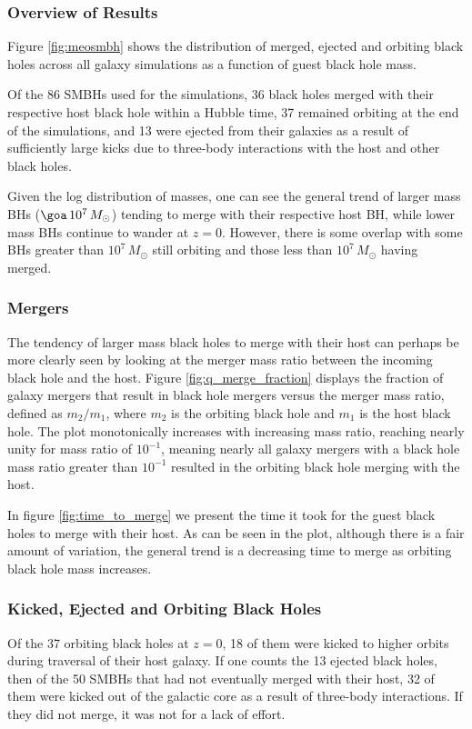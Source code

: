 \documentclass[fleqn,usenatbib,useAMS]{mnras}
\begin{document}
\subsubsection{Overview of Results}\label{sec:results_overview}
Figure \ref{fig:meosmbh} shows the distribution of merged, ejected and orbiting black holes across all galaxy simulations as a function of guest black hole mass.

Of the 86 SMBHs used for the simulations, 36 black holes merged with their respective host black hole within a Hubble time, 37 remained orbiting at the end of the simulations, and 13 were ejected from their galaxies as a result of sufficiently large kicks due to three-body interactions with the host and other black holes.

Given the log distribution of masses, one can see the general trend of larger mass BHs ($\goa\, 10^7\, M_{\odot}$) tending to merge with their respective host BH, while lower mass BHs continue to wander at $z=0$.  However, there is some overlap with some BHs greater than $10^7\, M_{\odot}$ still orbiting and those less than $10^7\, M_{\odot}$ having merged.

\subsubsection{Mergers}\label{sec:mergers}
The tendency of larger mass black holes to merge with their host can perhaps be more clearly seen by looking at the merger mass ratio between the incoming black hole and the host.  Figure \ref{fig:q_merge_fraction} displays the fraction of galaxy mergers that result in black hole mergers versus the merger mass ratio, defined as $m_2/m_1$, where $m_2$ is the orbiting black hole and $m_1$ is the host black hole.  The plot monotonically increases with increasing mass ratio, reaching nearly unity for mass ratio of $10^{-1}$, meaning nearly all galaxy mergers with a black hole mass ratio greater than $10^{-1}$ resulted in the orbiting black hole merging with the host.

In figure \ref{fig:time_to_merge} we present the time it took for the guest black holes to merge with their host.  As can be seen in the plot, although there is a fair amount of variation, the general trend is a decreasing time to merge as orbiting black hole mass increases.

\subsubsection{Kicked, Ejected and Orbiting Black Holes}\label{sec:kicked_orbiting}
Of the 37 orbiting black holes at $z=0$, 18 of them were kicked to higher orbits during traversal of their host galaxy.  If one counts the 13 ejected black holes, then of the 50 SMBHs that had not eventually merged with their host, 32 of them were kicked out of the galactic core as a result of three-body interactions.  If they did not merge, it was not for a lack of effort.
\end{document}
